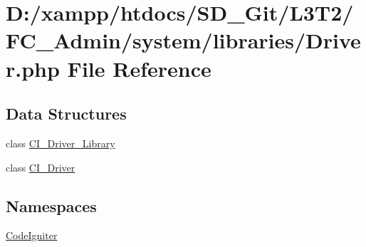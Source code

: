 \hypertarget{_admin_2system_2libraries_2_driver_8php}{}\section{D\+:/xampp/htdocs/\+S\+D\+\_\+\+Git/\+L3\+T2/\+F\+C\+\_\+\+Admin/system/libraries/\+Driver.php File Reference}
\label{_admin_2system_2libraries_2_driver_8php}
\subsection*{Data Structures}
\begin{DoxyCompactItemize}
\item 
class \hyperlink{class_c_i___driver___library}{C\+I\+\_\+\+Driver\+\_\+\+Library}
\item 
class \hyperlink{class_c_i___driver}{C\+I\+\_\+\+Driver}
\end{DoxyCompactItemize}
\subsection*{Namespaces}
\begin{DoxyCompactItemize}
\item 
 \hyperlink{namespace_code_igniter}{Code\+Igniter}
\end{DoxyCompactItemize}
